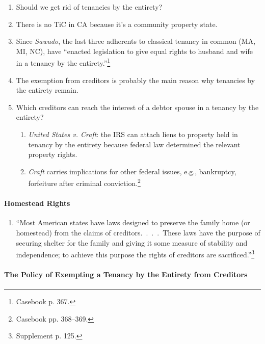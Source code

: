 \begin{enumerate}
    \item Should we get rid of tenancies by the entirety?
        \item There is no TiC in CA because it's a community property state.
    \item Since \emph{Sawado}, the last three adherents to classical tenancy 
    in common (MA, MI, NC), have ``enacted legislation to give equal rights to 
    husband and wife in a tenancy by the entirety.''\footnote{Casebook p. 367.}
    \item The exemption from creditors is probably the main reason why 
    tenancies by the entirety remain.
    \item Which creditors can reach the interest of a debtor spouse in a 
    tenancy by the entirety?
    \begin{enumerate}
        \item \emph{United States v. Craft}: the IRS can attach liens to 
        property held in tenancy by the entirety because federal law 
        determined the relevant property rights.
        \item \emph{Craft} carries implications for other federal 
        issues, e.g., bankruptcy, forfeiture after criminal 
        conviction.\footnote{Casebook pp. 368--369.}
    \end{enumerate}
\end{enumerate}

\paragraph{Homestead Rights}

\begin{enumerate}
    \item ``Most American states have laws designed to preserve the family 
    home (or homestead) from the claims of creditors.~.~.~.~These laws have 
    the purpose of securing shelter for the family and giving it some measure 
    of stability and independence; to achieve this purpose the rights of 
    creditors are sacrificed.''\footnote{Supplement p. 125.}
\end{enumerate}

\paragraph{The Policy of Exempting a Tenancy by the Entirety from Creditors}

